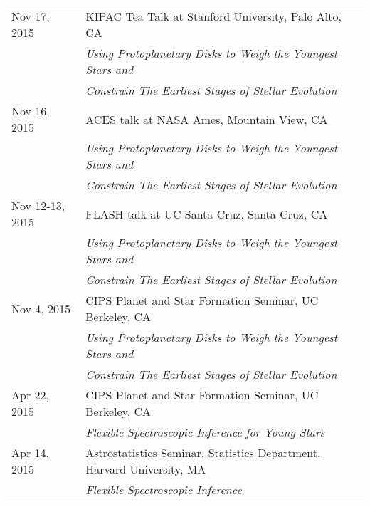\begin{longtable}{@{\hspace{10pt}}p{1.2in}l}
  Nov 17, 2015 & KIPAC Tea Talk at Stanford University, Palo Alto, CA \\
  & \emph{Using Protoplanetary Disks to Weigh the Youngest Stars and} \\
  & \emph{Constrain The Earliest Stages of Stellar Evolution} \\[\rowskip]
  Nov 16, 2015 & ACES talk at NASA Ames, Mountain View, CA \\
  & \emph{Using Protoplanetary Disks to Weigh the Youngest Stars and} \\
  & \emph{Constrain The Earliest Stages of Stellar Evolution} \\[\rowskip]
  Nov 12-13, 2015 & FLASH talk at UC Santa Cruz, Santa Cruz, CA \\
  & \emph{Using Protoplanetary Disks to Weigh the Youngest Stars and} \\
  & \emph{Constrain The Earliest Stages of Stellar Evolution} \\[\rowskip]
  Nov 4, 2015 & CIPS Planet and Star Formation Seminar, UC Berkeley, CA\\
  & \emph{Using Protoplanetary Disks to Weigh the Youngest Stars and} \\
  & \emph{Constrain The Earliest Stages of Stellar Evolution} \\[\rowskip]
  Apr 22, 2015 & CIPS Planet and Star Formation Seminar, UC Berkeley, CA\\
  & \emph{Flexible Spectroscopic Inference for Young Stars} \\[\rowskip]
  Apr 14, 2015 & Astrostatistics Seminar, Statistics Department, Harvard University, MA \\
  & \emph{Flexible Spectroscopic Inference} \\[\rowskip]
\end{longtable}

